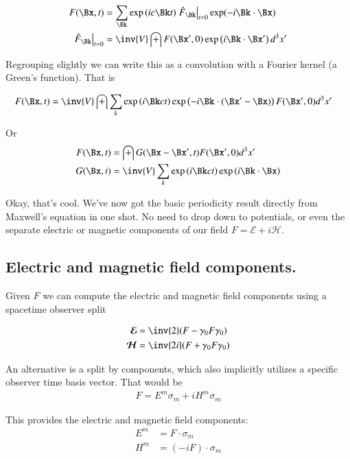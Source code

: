 \documentclass{article}
\newcommand{\EE}[0]{\boldsymbol{\mathcal{E}}}
\newcommand{\HH}[0]{\boldsymbol{\mathcal{H}}}
\begin{document}
\begin{align}
F(\Bx,t) &= \sum_{\Bk} \exp\left(i c \Bk t \right) {\left.\hat{F}_{\Bk}\right\vert}_{t=0} \exp(-i \Bk \cdot \Bx) \\
{\left.\hat{F}_{\Bk}\right\vert}_{t=0} &= \inv{V} \int F(\Bx', 0) \exp\left( i\Bk \cdot \Bx' \right) d^3 x'
\end{align}

Regrouping slightly we can write this as a convolution with a Fourier kernel (a Green's function).  That is

\begin{align}
F(\Bx,t) &= \inv{V} \int \sum_k \exp\left( i \Bk ct \right) \exp\left( - i \Bk \cdot (\Bx' - \Bx) \right) F(\Bx', 0) d^3 x'
\end{align}

Or
\begin{align}\label{eqn:bivectorSolution}
F(\Bx,t) &= \int G(\Bx - \Bx', t) F(\Bx', 0) d^3 x' \\
G(\Bx,t) &= \inv{V} \sum_k \exp\left( i \Bk ct \right) \exp\left( i \Bk \cdot \Bx \right)
\end{align}

Okay, that's cool.  We've now got the basic periodicity result directly from Maxwell's equation in one shot.  No need to drop down to
potentials, or even the separate electric or magnetic components of our field $F = \EE + i \HH$.

\subsection{ Electric and magnetic field components. }

Given $F$ we can compute the electric and magnetic field components using a spacetime observer split

\begin{align*}
\EE &= \inv{2}(F - \gamma_0 F \gamma_0 ) \\
\HH &= \inv{2i}(F + \gamma_0 F \gamma_0 ) \\
\end{align*}

An alternative is a split by components, which also implicitly utilizes
a specific observer time basis vector.  That would be
\begin{align*}
F = E^m \sigma_m + i H^m \sigma_m
\end{align*}

This provides the electric and magnetic field components:
\begin{align*}
E^m &= F \cdot \sigma_m \\
H^m &= (-i F) \cdot \sigma_m
\end{align*}
\end{document}
